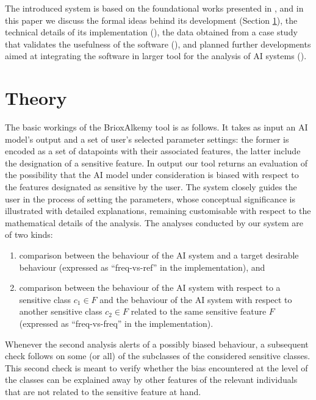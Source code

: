 \documentclass[
]{ceurart}
\begin{document}
The introduced system is based on the foundational works presented in \cite{dap21,dagp22,gp23}, and in this paper we discuss the formal ideas behind its development (Section \ref{sec:theory}), the technical details of its implementation  (), the data obtained from a case study that validates the usefulness of the software (), and planned further developments aimed at integrating the software in larger tool for the analysis of AI systems ().

\section{Theory}\label{sec:theory}

The basic workings of the BrioxAlkemy tool is as follows. It takes as input an AI model's output and a set of user's selected parameter settings: the former is encoded as a set of datapoints with their associated features, the latter include the designation of a sensitive feature. In output our tool returns an evaluation of the possibility that the AI model under consideration is biased with respect to the features designated as sensitive by the user. The system closely guides the user in the process of setting the parameters, whose conceptual significance is illustrated with detailed explanations, remaining customisable with respect to the mathematical details of the analysis. 
The analyses conducted by our system are of two kinds: 

\begin{enumerate}
	\item comparison between the behaviour of the AI system and a target desirable behaviour (expressed as ``freq-vs-ref'' in the implementation), and
	
	\item comparison between the behaviour of the AI system with respect to a sensitive class $c_1\in F$ and the behaviour of the AI system with respect to another sensitive class $c_2\in F$ related to the same sensitive feature $F$ (expressed as ``freq-vs-freq'' in the implementation).
\end{enumerate}

Whenever the second analysis alerts of a possibly biased behaviour, a subsequent check follows on some (or all) of the subclasses of the considered sensitive classes. This second check is meant to verify whether the bias encountered at the level of the classes can be explained away by other features of the relevant individuals that are not related to the sensitive feature at hand.
\end{document}
